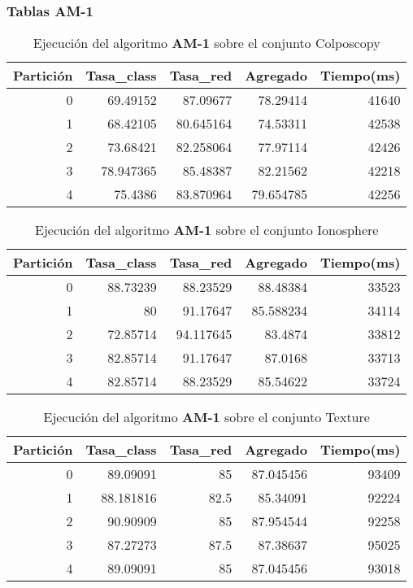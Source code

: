 \documentclass[size=a4, parskip=half, titlepage=false, toc=flat, toc=bib, 12pt]{scrartcl}
\begin{document}
\newpage

\subsubsection{Tablas AM-1}

 \begin{table}[ht]
  \centering
  \begin{tabular}[t]{rrrrr}
  \toprule
  Partición &Tasa\_class &Tasa\_red & Agregado & Tiempo(ms)\\
  \midrule
0         & 69.49152  & 87.09677  & 78.29414  & 41640  \\
1         & 68.42105  & 80.645164 & 74.53311  & 42538  \\
2         & 73.68421  & 82.258064 & 77.97114  & 42426  \\
3         & 78.947365 & 85.48387  & 82.21562  & 42218  \\
4         & 75.4386   & 83.870964 & 79.654785 & 42256  \\
  \bottomrule
  \end{tabular}
  \caption{Ejecución del algoritmo \textbf{AM-1} sobre el conjunto Colposcopy }
  \end{table}%

 \begin{table}[ht]
  \centering
  \begin{tabular}[t]{rrrrr}
  \toprule
  Partición &Tasa\_class &Tasa\_red & Agregado & Tiempo(ms)\\
  \midrule
0         & 88.73239  & 88.23529  & 88.48384  & 33523  \\
1         & 80        & 91.17647  & 85.588234 & 34114  \\
2         & 72.85714  & 94.117645 & 83.4874   & 33812  \\
3         & 82.85714  & 91.17647  & 87.0168   & 33713  \\
4         & 82.85714  & 88.23529  & 85.54622  & 33724  \\
  \bottomrule
  \end{tabular}
  \caption{Ejecución del algoritmo \textbf{AM-1} sobre el conjunto Ionosphere}
  \end{table}%

 \begin{table}[ht]
  \centering
  \begin{tabular}[t]{rrrrr}
  \toprule
  Partición &Tasa\_class &Tasa\_red & Agregado & Tiempo(ms)\\
  \midrule
0         & 89.09091  & 85       & 87.045456 & 93409  \\
1         & 88.181816 & 82.5     & 85.34091  & 92224  \\
2         & 90.90909  & 85       & 87.954544 & 92258  \\
3         & 87.27273  & 87.5     & 87.38637  & 95025  \\
4         & 89.09091  & 85       & 87.045456 & 93018  \\
\bottomrule
  \end{tabular}
  \caption{Ejecución del algoritmo \textbf{AM-1} sobre el conjunto Texture}
  \end{table}%
\end{document}
